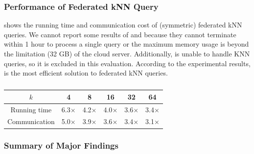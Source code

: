 \subsubsection{Performance of Federated kNN Query}
\label{sec:exp-symm-knn}

 shows the running time and communication cost of (symmetric) federated kNN queries. 
We cannot report some results of \EDBT and \conclave because they cannot terminate within 1 hour to process a single query or the maximum memory usage is beyond the limitation (32 GB) of the cloud server. 
Additionally, \ICDE is unable to handle KNN queries, so it is excluded in this evaluation.
According to the experimental results, \sysname is the most efficient solution to federated kNN queries.

\begin{table}[t]
    \centering  
    \caption{}\label{tab:bound-improvement}
    \begin{tabular}{c *{5}{c}}
    \hline  
    $k$ & 4 & 8 & 16 & 32 & 64 \\  
    \hline  
    Running time & 6.3$\times$ & 4.2$\times$ & 4.0$\times$ & 3.6$\times$ & 3.4$\times$ \\  
    Communication & 5.0$\times$ & 3.9$\times$ & 3.6$\times$ & 3.4$\times$ & 3.1$\times$ \\  
    \hline  
    \end{tabular}  
\end{table} 


\subsubsection{Summary of Major Findings}
\label{sec:exp-symm-summary}

